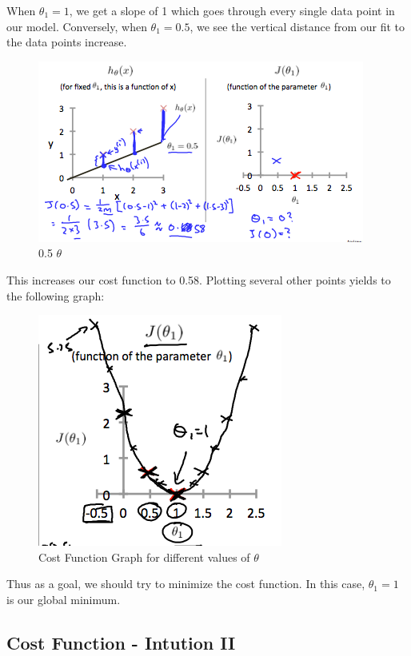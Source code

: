 \documentclass[
]{article}
\begin{document}
When \(\theta_1 = 1\), we get a slope of 1 which goes through every
single data point in our model. Conversely, when \(\theta_1 = 0.5\), we
see the vertical distance from our fit to the data points increase.

\begin{figure}
\centering
\includegraphics{thetapointfive.png}
\caption{0.5 \(\theta\)}
\end{figure}

This increases our cost function to 0.58. Plotting several other points
yields to the following graph:

\begin{figure}
\centering
\includegraphics{cost_function_graph.png}
\caption{Cost Function Graph for different values of \(\theta\)}
\end{figure}

Thus as a goal, we should try to minimize the cost function. In this
case, \(\theta_1 = 1\) is our global minimum.

\hypertarget{cost-function---intution-ii}{%
\subsection{Cost Function - Intution
II}\label{cost-function---intution-ii}}
\end{document}
